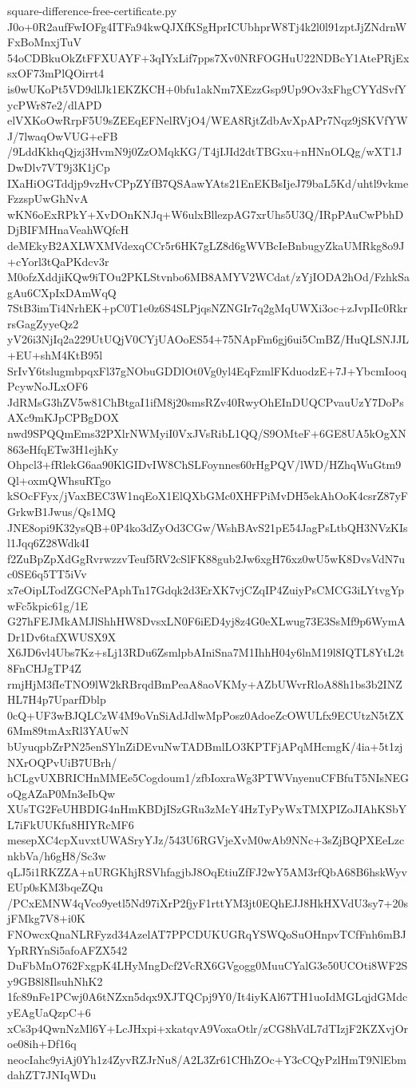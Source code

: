\documentclass[11pt]{article}
\theoremstyle{definition}
\theoremstyle{remark}
\begin{document}
\begin{filecontents*}[overwrite]{square-difference-free-certificate.py}
J0o+0R2aufFwIOFg4ITFa94kwQJXfKSgHprICUbhprW8Tj4k2l0l91zptJjZNdrnWFxBoMnxjTuV
54oCDBkuOkZtFFXUAYF+3qIYxLif7pps7Xv0NRFOGHuU22NDBcY1AtePRjExsxOF73mPlQOirrt4
is0wUKoPt5VD9dlJk1EKZKCH+0bfu1akNm7XEzzGsp9Up9Ov3xFhgCYYdSvfYycPWr87e2/dlAPD
elVXKoOwRrpF5U9sZEEqEFNelRVjO4/WEA8RjtZdbAvXpAPr7Nqz9jSKVfYWJ/7lwaqOwVUG+eFB
/9LddKkhqQjzj3HvmN9j0ZzOMqkKG/T4jIJId2dtTBGxu+nHNnOLQg/wXT1JDwDlv7VT9j3K1jCp
IXaHiOGTddjp9vzHvCPpZYfB7QSAawYAts21EnEKBsIjeJ79baL5Kd/uhtl9vkmeFzzspUwGhNvA
wKN6oExRPkY+XvDOnKNJq+W6ulxBllezpAG7xrUhs5U3Q/IRpPAuCwPbhDDjBIFMHnaVeahWQfcH
deMEkyB2AXLWXMVdexqCCr5r6HK7gLZ8d6gWVBcIeBnbugyZkaUMRkg8o9J+cYorl3tQaPKdcv3r
M0ofzXddjiKQw9iTOu2PKLStvnbo6MB8AMYV2WCdat/zYjIODA2hOd/FzhkSagAu6CXpIxDAmWqQ
7StB3imTi4NrhEK+pC0T1e0z6S4SLPjqsNZNGIr7q2gMqUWXi3oc+zJvpIIc0RkrrsGagZyyeQz2
yV26i3NjIq2a229UtUQjV0CYjUAOoES54+75NApFm6gj6ui5CmBZ/HuQLSNJJL+EU+shM4KtB95l
SrIvY6tslugmbpqxFl37gNObuGDDlOt0Vg0yl4EqFzmlFKduodzE+7J+YbcmIooqPcywNoJLxOF6
JdRMsG3hZV5w81ChBtgaI1ifM8j20smsRZv40RwyOhEInDUQCPvauUzY7DoPsAXc9mKJpCPBgDOX
nwd9SPQQmEms32PXlrNWMyiI0VxJVsRibL1QQ/S9OMteF+6GE8UA5kOgXN863eHfqETw3H1ejhKy
Ohpcl3+fRlekG6aa90KlGIDvIW8ChSLFoynnes60rHgPQV/lWD/HZhqWuGtm9Ql+oxmQWhsuRTgo
kSOcFFyx/jVaxBEC3W1nqEoX1ElQXbGMc0XHFPiMvDH5ekAhOoK4csrZ87yFGrkwB1Jwus/Qs1MQ
JNE8opi9K32ysQB+0P4ko3dZyOd3CGw/WshBAvS21pE54JagPsLtbQH3NVzKIsl1Jqq6Z28Wdk4I
f2ZuBpZpXdGgRvrwzzvTeuf5RV2cSlFK88gub2Jw6xgH76xz0wU5wK8DvsVdN7uc0SE6q5TT5iVv
x7eOipLTodZGCNePAphTn17Gdqk2d3ErXK7vjCZqIP4ZuiyPsCMCG3iLYtvgYpwFc5kpic61g/1E
G27hFEJMkAMJlShhHW8DvsxLN0F6iED4yj8z4G0eXLwug73E3SsMf9p6WymADr1Dv6tafXWUSX9X
X6JD6vl4Ubs7Kz+sLj13RDu6ZsmlpbAIniSna7M1IhhH04y6lnM19l8IQTL8YtL2t8FnCHJgTP4Z
rmjHjM3fIeTNO9lW2kRBrqdBmPeaA8aoVKMy+AZbUWvrRloA88h1bs3b2INZHL7H4p7UparfDblp
0cQ+UF3wBJQLCzW4M9oVnSiAdJdlwMpPosz0AdoeZcOWULfx9ECUtzN5tZX6Mm89tmAxRl3YAUwN
bUyuqpbZrPN25enSYlnZiDEvuNwTADBmlLO3KPTFjAPqMHcmgK/4ia+5t1zjNXrOQPvUiB7UBrh/
hCLgvUXBRICHnMMEe5Cogdoum1/zfbIoxraWg3PTWVnyenuCFBfuT5NIsNEGoQgAZaP0Mn3eIbQw
XUsTG2FeUHBDIG4nHmKBDjISzGRu3zMcY4HzTyPyWxTMXPIZoJIAhKSbYL7iFkUUKfu8HIYRcMF6
mesepXC4cpXuvxtUWASryYJz/543U6RGVjeXvM0wAb9NNc+3sZjBQPXEeLzcnkbVa/h6gH8/Sc3w
qLJ5i1RKZZA+nURGKhjRSVhfagjbJ8OqEtiuZfFJ2wY5AM3rfQbA68B6hskWyvEUp0sKM3bqeZQu
/PCxEMNW4qVco9yetl5Nd97iXrP2fjyF1rttYM3jt0EQhEJJ8HkHXVdU3sy7+20sjFMkg7V8+i0K
FNOwcxQnaNLRFyzd34AzelAT7PPCDUKUGRqYSWQoSuOHnpvTCfFnh6mBJYpRRYnSi5afoAFZX542
DuFbMnO762FxgpK4LHyMngDcf2VcRX6GVgogg0MuuCYalG3e50UCOti8WF2Sy9GB8l8IlsuhNhK2
1fc89nFe1PCwj0A6tNZxn5dqx9XJTQCpj9Y0/It4iyKAl67TH1uoIdMGLqjdGMdcyEAgUaQzpC+6
xCs3p4QwnNzMl6Y+LcJHxpi+xkatqvA9VoxaOtlr/zCG8hVdL7dTIzjF2KZXvjOroe08ih+Df16q
neocIahc9yiAj0Yh1z4ZyvRZJrNu8/A2L3Zr61CHhZOc+Y3cCQyPzlHmT9NlEbmdahZT7JNIqWDu

\end{filecontents*}
\end{document}
